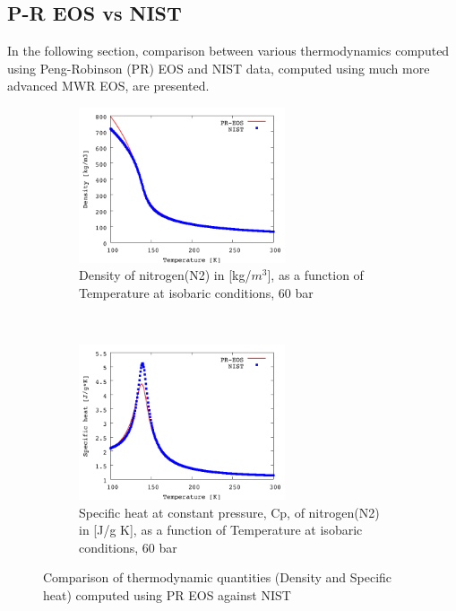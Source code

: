 \documentclass[11pt]{article}
\begin{document}
    \subsection {P-R EOS vs NIST}
    \label{sec:ComparePRvsNIST}
    In the following section, comparison between various thermodynamics computed using Peng-Robinson (PR) EOS and NIST data, computed using much more advanced MWR EOS, are presented. 
\begin{figure}[t!]
    \centering
    \begin{subfigure}[t]{0.5\textwidth}
        \centering
        \includegraphics[height=1.8in]{figures/N2_vsNIST_Density.png}
        \caption{Density of nitrogen(N2) in [kg/$m^{3}$], as a function of Temperature at isobaric conditions, 60 bar}
    \end{subfigure}%
    ~ 
    \begin{subfigure}[t]{0.5\textwidth}
        \centering
        \includegraphics[height=1.8in]{figures/N2_vsNIST_Cp.png}
        \caption{Specific heat at constant pressure, Cp, of nitrogen(N2) in [J/g K], as a function of Temperature at isobaric conditions, 60 bar}
    \end{subfigure}
    \caption{Comparison of thermodynamic quantities (Density and Specific heat) computed using PR EOS against NIST}
    \label{fig:DensityCpVsNIST}
\end{figure}
\end{document}
